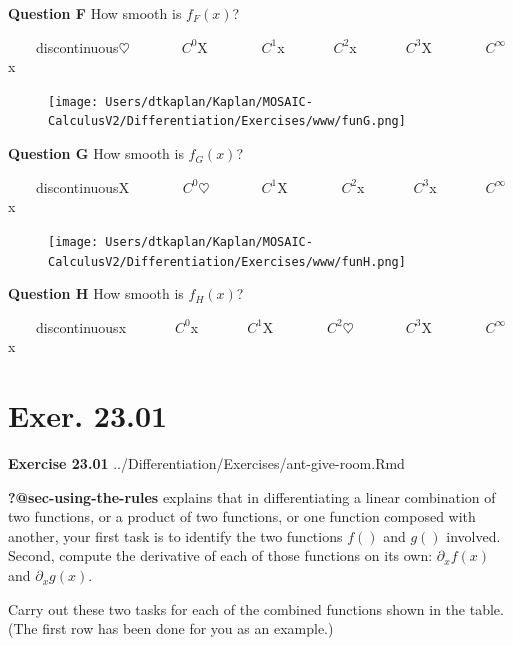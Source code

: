 \documentclass[
  letterpaper,
  DIV=11,
  numbers=noendperiod,
  oneside]{article}
\begin{document}
\begin{multicols}{2}
\textbf{Question F} How smooth is \(f_F(x)\)?

~~~~{discontinuous{\(\heartsuit\ \)}}~~~~~~~{\(C^0\){︎X
}}~~~~~~~{\(C^1\){x}}~~~~~~~{\(C^2\){x}}~~~~~~~{\(C^3\){︎X
}}~~~~~~~{\(C^\infty\){x}}

\begin{figure}

{\centering \texttt{[image: Users/dtkaplan/Kaplan/MOSAIC-CalculusV2/Differentiation/Exercises/www/funG.png]}

}

\end{figure}

\textbf{Question G} How smooth is \(f_G(x)\)?

~~~~{discontinuous{︎X
}}~~~~~~~{\(C^0\){\(\heartsuit\ \)}}~~~~~~~{\(C^1\){︎X
}}~~~~~~~{\(C^2\){x}}~~~~~~~{\(C^3\){x}}~~~~~~~{\(C^\infty\){x}}

\begin{figure}

{\centering \texttt{[image: Users/dtkaplan/Kaplan/MOSAIC-CalculusV2/Differentiation/Exercises/www/funH.png]}

}

\end{figure}

\textbf{Question H} How smooth is \(f_H(x)\)?

~~~~{discontinuous{x}}~~~~~~~{\(C^0\){x}}~~~~~~~{\(C^1\){︎X
}}~~~~~~~{\(C^2\){\(\heartsuit\ \)}}~~~~~~~{\(C^3\){︎X
}}~~~~~~~{\(C^\infty\){x}}

\hypertarget{exer.-23.01}{%
\section*{Exer. 23.01}\label{exer.-23.01}}

\textbf{Exercise 23.01} ../Differentiation/Exercises/ant-give-room.Rmd

\textbf{?@sec-using-the-rules} explains that in differentiating a linear
combination of two functions, or a product of two functions, or one
function composed with another, your first task is to identify the two
functions \(f()\) and \(g()\) involved. Second, compute the derivative
of each of those functions on its own: \(\partial_x f(x)\) and
\(\partial_x g(x)\).

Carry out these two tasks for each of the combined functions shown in
the table. (The first row has been done for you as an example.)


\end{multicols}
\end{document}
